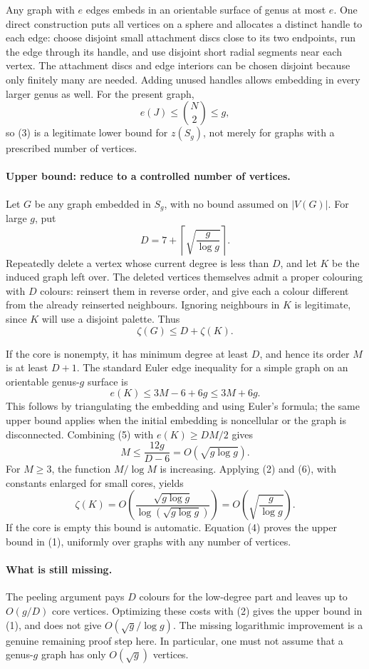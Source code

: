 Any graph with \(e\) edges embeds in an orientable surface of genus at most \(e\). One direct construction puts all vertices on a sphere and allocates a distinct handle to each edge: choose disjoint small attachment discs close to its two endpoints, run the edge through its handle, and use disjoint short radial segments near each vertex. The attachment discs and edge interiors can be chosen disjoint because only finitely many are needed. Adding unused handles allows embedding in every larger genus as well. For the present graph,
\[
 e(J)\leq\binom N2\leq g,
\]
so (3) is a legitimate lower bound for \(z(S_g)\), not merely for graphs with a prescribed number of vertices.

\paragraph{Upper bound: reduce to a controlled number of vertices.}
Let \(G\) be any graph embedded in \(S_g\), with no bound assumed on \(|V(G)|\). For large \(g\), put
\[
 D=7+\left\lceil\sqrt{\frac g{\log g}}\right\rceil.
\]
Repeatedly delete a vertex whose current degree is less than \(D\), and let \(K\) be the induced graph left over. The deleted vertices themselves admit a proper colouring with \(D\) colours: reinsert them in reverse order, and give each a colour different from the already reinserted neighbours. Ignoring neighbours in \(K\) is legitimate, since \(K\) will use a disjoint palette. Thus
\[
 \zeta(G)\leq D+\zeta(K). \tag{4}
\]

If the core is nonempty, it has minimum degree at least \(D\), and hence its order \(M\) is at least \(D+1\). The standard Euler edge inequality for a simple graph on an orientable genus-\(g\) surface is
\[
 e(K)\leq3M-6+6g\leq3M+6g. \tag{5}
\]
This follows by triangulating the embedding and using Euler's formula; the same upper bound applies when the initial embedding is noncellular or the graph is disconnected. Combining (5) with \(e(K)\geq DM/2\) gives
\[
 M\leq\frac{12g}{D-6}=O(\sqrt{g\log g}). \tag{6}
\]
For \(M\geq3\), the function \(M/\log M\) is increasing. Applying (2) and (6), with constants enlarged for small cores, yields
\[
 \zeta(K)=O\left(\frac{\sqrt{g\log g}}{
          \log(\sqrt{g\log g})}\right)
 =O\left(\sqrt{\frac g{\log g}}\right).
\]
If the core is empty this bound is automatic. Equation (4) proves the upper bound in (1), uniformly over graphs with any number of vertices.

\paragraph{What is still missing.}
The peeling argument pays \(D\) colours for the low-degree part and leaves up to \(O(g/D)\) core vertices. Optimizing these costs with (2) gives the upper bound in (1), and does not give \(O(\sqrt g/\log g)\). The missing logarithmic improvement is a genuine remaining proof step here. In particular, one must not assume that a genus-\(g\) graph has only \(O(\sqrt g)\) vertices.

